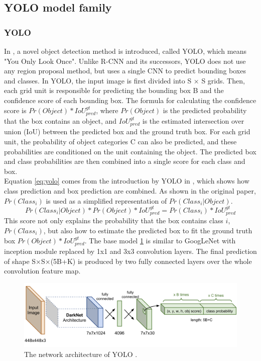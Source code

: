 \subsection{YOLO model family}
\subsubsection{YOLO}
In \cite{DBLP:journals/corr/RedmonDGF15}, a novel object detection method is introduced, called YOLO, which means "You Only Look Once". Unlike R-CNN and its successors, YOLO does not use any region proposal method, but uses a single CNN to predict bounding boxes and classes. In YOLO, the input image is first divided into S × S grids. Then, each grid unit is responsible for predicting the bounding box B and the confidence score of each bounding box. The formula for calculating the confidence score is \(Pr(Object)*IoU_{pred}^{gt}\), where \(Pr(Object)\) is the predicted probability that the box contains an object, and \(IoU_{pred}^{gt}\) is the estimated intersection over union (IoU) between the predicted box and the ground truth box. For each grid unit, the probability of object categories C can also be predicted, and these probabilities are conditioned on the unit containing the object. The predicted box and class probabilities are then combined into a single score for each class and box. 
\\Equation \ref{eq:yolo} comes from the introduction by YOLO in \cite{DBLP:journals/corr/RedmonDGF15}, which shows how class prediction and box prediction are combined. As shown in the original paper, \(Pr(Class_i)\) is used as a simplified representation of \(Pr(Class_i|Object)\).
\begin{equation}
	\label{eq:yolo}
	Pr(Class_i|Object)*Pr(Object)*IoU^{gt}_{pred} = Pr(Class_i)*IoU^{gt}_{pred}
\end{equation}
This score not only explains the probability that the box contains class \(i\), \(Pr(Class_i)\), but also how to estimate the predicted box to fit the ground truth box \(Pr(Object)*IoU_{pred}^{gt}\). 
The base model \ref{fig:yolo-network} is similar to GoogLeNet with inception module replaced by 1x1 and 3x3 convolution layers. The final prediction of shape S×S×(5B+K) is produced by two fully connected layers over the whole convolution feature map.
\begin{figure}[ht!]
	\centerline{\includegraphics[width=1\linewidth]{Figs/yolo-network.png}}
	\caption{The network architecture of YOLO \cite{DBLP:journals/corr/RedmonDGF15}.}
	\label{fig:yolo-network}
\end{figure}
